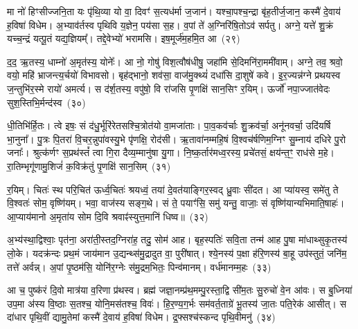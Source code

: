 {\anuvakamend[{रपः॑ पत॒त्रिणी॒र्या अꣳह॑सो॒ याः खना॑मि वो॒\-ऽष्टाद॑श च}]}%

मा नो॑ हिꣳसीज्जनि॒ता यः पृ॑थि॒व्या यो वा॒ दिवꣳ॑ स॒त्यध॑र्मा ज॒जान॑। यश्चा॒पश्च॒न्द्रा बृ॑ह॒तीर्ज॒जान॒ कस्मै॑ दे॒वाय॑ ह॒विषा॑ विधेम। अ॒भ्याव॑र्तस्व पृथिवि य॒ज्ञेन॒ पय॑सा स॒ह। व॒पां ते॑ अ॒ग्निरि॑षि॒तो\-ऽव॑ सर्पतु। अग्ने॒ यत्ते॑ शु॒क्रं यच्च॒न्द्रं यत्पू॒तं यद्य॒ज्ञियम्᳚। तद्दे॒वेभ्यो॑ भरामसि। इष॒मूर्ज॑म॒हमि॒त आ~(२९)

द॒द॒ ऋ॒तस्य॒ धाम्नो॑ अ॒मृत॑स्य॒ योनेः᳚। आ नो॒ गोषु॑ विश॒त्वौष॑धीषु॒ जहा॑मि से॒दिमनि॑रा॒ममी॑वाम्। अग्ने॒ तव॒ श्रवो॒ वयो॒ महि॑ भ्राजन्त्य॒र्चयो॑ विभावसो। बृह॑द्भानो॒ शव॑सा॒ वाज॑मु॒क्थ्यं॑ दधा॑सि दा॒शुषे॑ कवे। इ॒र॒ज्यन्न॑ग्ने प्रथयस्व ज॒न्तुभि॑र॒स्मे रायो॑ अमर्त्य। स द॑र्\mbox{}श॒तस्य॒ वपु॑षो॒ वि रा॑जसि पृ॒णक्षि॑ सान॒सिꣳ र॒यिम्। ऊर्जो॑ नपा॒ज्जात॑वेदः सुश॒स्तिभि॒र्मन्द॑स्व~(३०)

धी॒तिभि॑र्हि॒तः। त्वे इषः॒ सं द॑धु॒र्भूरि॑रेतसश्चि॒त्रोत॑यो वा॒मजा॑ताः। पा॒व॒कव॑र्चाः शु॒क्रव॑र्चा॒ अनू॑नवर्चा॒ उदि॑यर्\mbox{}षि भा॒नुना᳚। पु॒त्रः पि॒तरा॑ वि॒चर॒न्नुपा॑वस्यु॒भे पृ॑णक्षि॒ रोद॑सी। ऋ॒तावा॑नम्महि॒षं वि॒श्वच॑र्\mbox{}षणिम॒ग्निꣳ सु॒म्नाय॑ दधिरे पु॒रो जनाः᳚। श्रुत्क॑र्णꣳ स॒प्रथ॑स्तं᳚ त्वा गि॒रा दैव्य॒म्मानु॑षा यु॒गा। नि॒ष्क॒र्तार॑मध्व॒रस्य॒ प्रचे॑तसं॒ क्षय॑न्त॒ꣳ॒ राध॑से म॒हे। रा॒तिम्भृगू॑णामु॒शिजं॑ क॒विक्र॑तुं पृ॒णक्षि॑ सान॒सिम्~(३१)

र॒यिम्। चितः॑ स्थ परि॒चित॑ ऊर्ध्व॒चितः॑ श्रयध्वं॒ तया॑ दे॒वत॑याङ्गिर॒स्वद् ध्रु॒वाः सी॑दत। आ प्या॑यस्व॒ समे॑तु ते वि॒श्वतः॑ सोम॒ वृष्णि॑यम्। भवा॒ वाज॑स्य सङ्ग॒थे। सं ते॒ पयाꣳ॑सि॒ समु॑ यन्तु॒ वाजाः॒ सं वृष्णि॑यान्यभिमाति॒षाहः॑। आ॒प्याय॑मानो अ॒मृता॑य सोम दि॒वि श्रवाꣴ॑स्युत्त॒मानि॑ धिष्व॥~(३२)

{\anuvakamend[{आ मन्द॑स्व सान॒सिमेका॒न्नच॑त्वारि॒ꣳ॒शच्च॑}]}%

अ॒भ्य॑स्था॒द्विश्वाः॒ पृत॑ना॒ अरा॑ती॒स्तद॒ग्निरा॑ह॒ तदु॒ सोम॑ आह। बृह॒स्पतिः॑ सवि॒ता तन्म॑ आह पु॒षा मा॑धाथ्सुकृ॒तस्य॑ लो॒के। यदक्र॑न्दः प्रथ॒मं जाय॑मान उ॒द्यन्थ्स॑मु॒द्रादुत वा॒ पुरी॑षात्। श्ये॒नस्य॑ प॒क्षा ह॑रि॒णस्य॑ बा॒हू उप॑स्तुतं॒ जनि॑म॒ तत्ते॑ अर्वन्न्। अ॒पां पृ॒ष्ठम॑सि॒ योनि॑र॒ग्नेः स॑मु॒द्रम॒भितः॒ पिन्व॑मानम्। वर्ध॑मानम्म॒हः~(३३)

आ च॒ पुष्क॑रं दि॒वो मात्र॑या व॒रिणा प्र॑थस्व। ब्रह्म॑ जज्ञा॒नम्प्र॑थ॒मम्पु॒रस्ता॒द्वि सी॑म॒तः सु॒रुचो॑ वे॒न आ॑वः। स बु॒ध्निया॑ उप॒मा अ॑स्य वि॒ष्ठाः स॒तश्च॒ योनि॒मस॑तश्च॒ विवः॑। हि॒र॒ण्य॒ग॒र्भः सम॑वर्त॒ताग्रे॑ भू॒तस्य॑ जा॒तः पति॒रेक॑ आसीत्। स दा॑धार पृथि॒वीं द्यामु॒तेमां कस्मै॑ दे॒वाय॑ ह॒विषा॑ विधेम। द्र॒फ्सश्च॑स्कन्द पृथि॒वीमनु॑~(३४)

